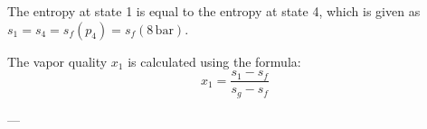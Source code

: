 The entropy at state 1 is equal to the entropy at state 4, which is given as \( s_1 = s_4 = s_f(p_4) = s_f(8 \, \text{bar}) \).  

The vapor quality \( x_1 \) is calculated using the formula:  
\[
x_1 = \frac{s_1 - s_f}{s_g - s_f}
\]  

---